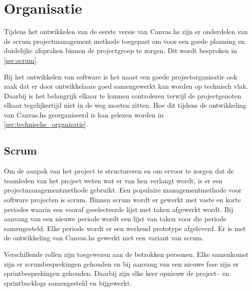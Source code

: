 \chapter{Organisatie} \label{hoofdstuk:organisatie}
Tijdens het ontwikkelen van de eerste versie van Canvas.hs zijn er onderdelen van de scrum projectmanagement methode toegepast om voor een goede planning en duidelijke afspraken binnen de projectgroep te zorgen. Dit wordt besproken in \autoref{sec:scrum}.

Bij het ontwikkelen van software is het naast een goede projectorganisatie ook zaak dat er door ontwikkelaars goed samengewerkt kan worden op technisch vlak. Daarbij is het belangrijk elkaar te kunnen controleren terwijl de projectgenoten elkaar tegelijkertijd niet in de weg moeten zitten. Hoe dit tijdens de ontwikkeling van Canvas.hs georganiseerd is kan gelezen worden in \autoref{sec:technische_organisatie}.

\section{Scrum} \label{sec:scrum}
Om de aanpak van het project te structureren en om ervoor te zorgen dat de teamleden van het project weten wat er van hen verlangt wordt, is er een projectmanagementmethode gebruikt. Een populaire managementmethode voor software projecten is scrum. Binnen scrum wordt er gewerkt met vaste en korte periodes waarin een vooraf geselecteerde lijst met taken afgewerkt wordt. Bij aanvang van een nieuwe periode wordt een lijst van taken voor die periode samengesteld. Elke periode wordt er een werkend prototype afgeleverd. Er is met de ontwikkeling van Canvas.hs gewerkt met een variant van scrum.

Verschillende rollen zijn toegewezen aan de betrokken personen. Elke samenkomst zijn er scrumbesprekingen gehouden en bij aanvang van een nieuwe fase zijn er sprintbesprekingen gehouden. Daarbij zijn elke keer opnieuw de project– en sprintbacklogs samengesteld en bijgewerkt.

